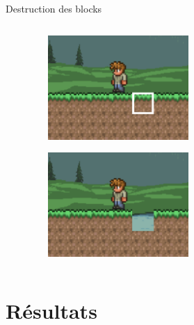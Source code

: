 \documentclass[aspectratio=169]{beamer}
\begin{document}
\begin{frame}{Destruction des blocks}
    \begin{columns}
        \centering
        \begin{column}{0.5\textwidth}
            \centering
            \lipsum[1][1-5]
        \end{column}
        \begin{column}{0.5\textwidth}
            \centering
            \begin{figure}
                \centering
                \captionsetup{format=sanslabel}
                \includegraphics[width=0.5\textwidth]{assets/destruction_1.png}
            \end{figure}
            \begin{figure}
                \centering
                \captionsetup{format=sanslabel}
                \includegraphics[width=0.5\textwidth]{assets/destruction_2.png}
            \end{figure}
        \end{column}
    \end{columns}
\end{frame}


\section{Résultats}
\end{document}
